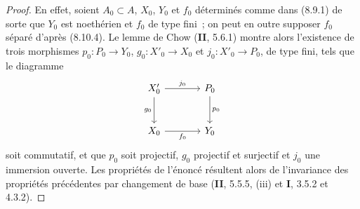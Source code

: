 \begin{proof}
En effet, soient $A_0\subset A$, $X_0$, $Y_0$ et $f_0$ déterminés comme dans
(8.9.1) de sorte que $Y_0$ est noethérien et $f_0$ de type fini~; on peut en
outre supposer $f_0$ séparé d'après (8.10.4). Le lemme de Chow (\textbf{II}, 5.6.1)
montre alors l'existence de trois morphismes $p_0:P_0\to Y_0$,
$g_0:X'_0\to X_0$ et $j_0:X'_0\to P_0$, de type fini, tels que le diagramme
\[
\begin{tikzcd}[column sep=large,row sep=large]
X'_0 \arrow[r,"j_0"] \arrow[d,"g_0"'] & P_0 \arrow[d,"p_0"] \\
X_0 \arrow[r,"f_0"'] & Y_0
\end{tikzcd}
\]
soit commutatif, et que $p_0$ soit projectif, $g_0$ projectif et surjectif et
$j_0$ une immersion ouverte. Les propriétés de l'énoncé résultent alors de
l'invariance des propriétés précédentes par changement de base (\textbf{II}, 5.5.5,
(iii) et \textbf{I}, 3.5.2 et 4.3.2).
\end{proof}

